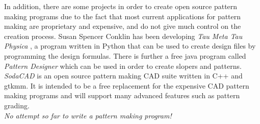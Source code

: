 \documentclass[10pt,letterpaper]{ltugboat}
\begin{document}
In addition, there are some projects in order to create open source pattern making programs due to the fact that most current applications for pattern making are proprietary and expensive, and do not give much control on the creation process. Susan Spencer Conklin has been developing \textit{Tau Meta Tau Physica} \cite{taumeta}, a program written in Python that can be used to create design files by programming the design formulas. There is further a free java program called \textit{Pattern Designer} \cite{patterndesigner} which can be used in order to create slopers and patterns. \textit{SodaCAD} \cite{sodacad} is an open source pattern making CAD suite written in C++ and gtkmm. It is intended to be a free replacement for the expensive CAD pattern making programs and will support many advanced features such as pattern grading.\\
\textit{No attempt so far to write a \MP { }pattern making program!}


\end{document}
